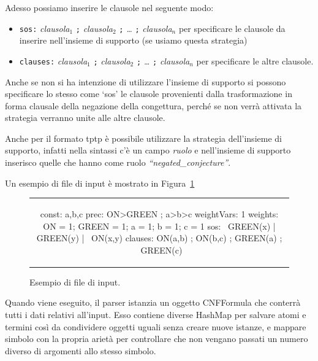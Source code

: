 \documentclass[a4paper,11pt]{article} %
\newcommand{\sintassi}{\texttt}
\newcommand{\classe}{\textsf}
\newenvironment{myfigure}[2]
  {\newcommand{\didascalia}{\caption{#1}}%
   \newcommand{\etichetta}{\label{#2}}%
   \begin{figure}[h!]\centering}
  {\didascalia\etichetta\end{figure}}
\begin{document}
Adesso possiamo inserire le clausole nel seguente modo:
\vspace{-1ex}
\begin{itemize}
  \item{\sintassi{sos:} \emph{clausola$_1$} \sintassi{;} 
  \emph{clausola$_2$} \sintassi{;} \emph{\ldots} \sintassi{;} \emph{clausola$_n$}}
  per specificare le clausole da inserire nell'insieme di supporto (se usiamo questa strategia)
\vspace{-1ex}
  \item{\sintassi{clauses:} \emph{clausola$_1$} \sintassi{;} 
  \emph{clausola$_2$} \sintassi{;} \emph{\ldots} \sintassi{;} \emph{clausola$_n$}}
  per specificare le altre clausole.
\end{itemize}
\vspace{-1ex}
Anche se non si ha intenzione di utilizzare l'insieme di supporto si possono
specificare lo stesso come `sos' le clausole provenienti dalla trasformazione in
forma clausale della negazione della congettura, perché se non verrà attivata la
strategia verranno unite alle altre clausole.

Anche per il formato tptp è possibile utilizzare la strategia dell'insieme di 
supporto, infatti nella sintassi c'è un campo \emph{ruolo} e nell'insieme di
supporto inserisco quelle che hanno come ruolo \emph{``negated\_conjecture''}.

Un esempio di file di input è mostrato in Figura~\ref{fig: esempio input}
\begin{myfigure}{Esempio di file di input.}{fig: esempio input}
\begin{tabular}{c}
\begin{codice}
const: a,b,c
prec: ON>GREEN ; a>b>c
weightVars: 1
weights: ON = 1; GREEN = 1; a = 1; b = 1; c = 1
sos: ~GREEN(x) | GREEN(y) | ~ON(x,y)
clauses: ON(a,b) ; ON(b,c) ; GREEN(a) ; ~GREEN(c)
\end{codice}
\end{tabular}
\end{myfigure}

Quando viene eseguito, il parser istanzia un oggetto \classe{CNFFormula} che
conterrà tutti i dati relativi all'input. 
Esso contiene diverse \classe{HashMap} per
salvare atomi e termini così da condividere oggetti uguali senza creare
nuove istanze, e
mappare simbolo con la propria arietà per controllare che non vengano passati 
un numero diverso di argomenti allo stesso simbolo.
\end{document}
